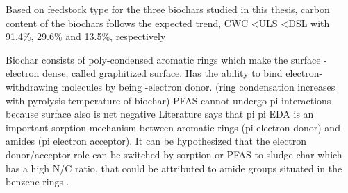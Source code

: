 \begin{table}
\centering
\caption{Surface area (SA), pore volume (PV), elemental content (C, O, H, N) and ratios for the biochars produced for the batch tests.}
\end{table}

Based on feedstock type for the three biochars studied in this thesis, carbon content of the biochars follows the expected trend, CWC \textless ULS \textless DSL with 91.4\%, 29.6\% and 13.5\%, respectively 

 Biochar consists of poly-condensed aromatic rings which make the surface \textpi-electron dense, called graphitized surface. Has the ability to bind electron-withdrawing molecules by being \textpi-electron donor. (ring condensation increases with pyrolysis temperature of biochar) PFAS cannot undergo pi interactions because surface also is net negative \citep{Li2019} Literature says that pi pi EDA is an important sorption mechanism between aromatic rings (pi electron donor) and amides (pi electron acceptor). It can be hypothesized that the electron donor/acceptor role can be switched by sorption or PFAS to sludge char which has a high N/C ratio, that could be attributed to amide groups situated in the benzene rings \citep{Li2019}.
 
